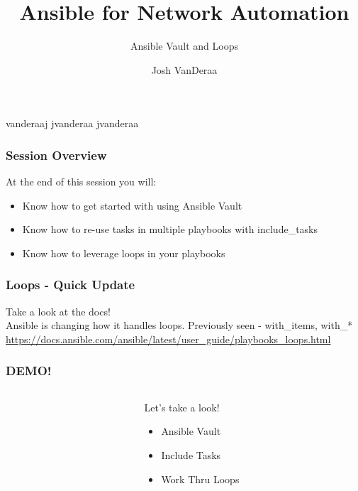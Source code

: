 \documentclass[aspectratio=169]{beamer}
\title{Ansible for Network Automation}
\subtitle{Ansible Vault and Loops}
\date{}
\author{Josh VanDeraa}
\begin{document}
\begin{frame}
  \maketitle
  \footnotesize
  \faTwitter vanderaaj \hfill \faGithub jvanderaa \hfill \faSlack jvanderaa
\end{frame}

\begin{frame}
  \frametitle{Session Overview}
  At the end of this session you will:
  \begin{itemize}
    \item <2-> Know how to get started with using Ansible Vault
    \item <3-> Know how to re-use tasks in multiple playbooks with include_tasks
    \item <3-> Know how to leverage loops in your playbooks
  \end{itemize}
\end{frame}

\begin{frame}
  \frametitle{Loops - Quick Update}
  \begin{center}
    \Huge Take a look at the docs!\\
    \normalsize
    Ansible is changing how it handles loops. Previously seen - with\_items, with\_*\\
    \url{https://docs.ansible.com/ansible/latest/user_guide/playbooks_loops.html}
  \end{center}
\end{frame}
  
\begin{frame}
  \frametitle{DEMO!}
  \begin{columns}
  \begin{column}{0.3\textwidth}
    \Huge
    \begin{center}
      \faDesktop 
      \hspace{.5cm}
      \faRocket     
    \end{center}
  \end{column}
  \begin{column}{0.7\textwidth}
    \huge 
      Let's take a look!
      \begin{itemize}
        \item Ansible Vault
        \item Include Tasks
        \item Work Thru Loops
      \end{itemize}
  \end{column}
  \end{columns}
\end{frame}
\end{document}
